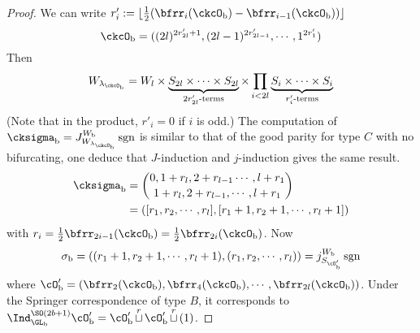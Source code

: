 \documentclass[12pt,a4paper]{amsart}
\newcommand{\sgn}{\operatorname{sgn}}
\numberwithin{equation}{section}
\theoremstyle{remark}
\def\half{{\tfrac{1}{2}}}
\def\floor#1{{\lfloor #1 \rfloor}}
\def\lamckb{\lambda_{\ckcO_{\mathrm b}}}
\def\cuprow{{\stackrel{r}{\sqcup}}}
\def\cuprow{{\,\stackrel{r}{\sqcup}\,}}
\begin{document}
\begin{proof}
{      We can write
      $r'_{i} := \floor{\half(\bfrr_{i}(\ckcO_{\mathrm b})-\bfrr_{i-1}(\ckcO_{\mathrm b}))}$
      \[
        \ckcO_{\mathrm b} %
        = ((2l)^{2r'_{2l}+1}, (2l-1)^{2r'_{2l-1}},\cdots, 1^{2r'_{1}})
      \]
      Then
      \[
        W_{\lamckb} = W_{l} \times \underbrace{S_{2l}\times \cdots \times S_{2l}}_{2r'_{2l}\text{-terms}} \times \prod_{i<2l} \underbrace{S_{i}\times \cdots\times S_{i}}_{r'_{i}\text{-terms}}
      \]
      (Note that in the product, $r'_{i}=0$ if $i$ is odd.) The computation of
      $\cksigma_{\mathrm b} = J_{W_{\lamckb}}^{W_{\mathrm b}} \sgn$ is similar to that of the
      good parity for type $C$ with no bifurcating, one deduce that
      $J$-induction and $j$-induction gives the same result.
      \[
        \begin{split}
          \cksigma_{\mathrm b} &=
          \binom{0, 1+r_{l}, 2+r_{l-1}\cdots, l+r_{1}}{1+r_{l},2+r_{l-1}, \cdots, l+r_{1}}\\
          & = ([r_{1},r_{2},\cdots, r_{l}],[r_{1}+1,r_{2}+1,\cdots,r_{l}+1])\\
        \end{split}
      \]
      with $r_{i} = \half\bfrr_{2i-1}(\ckcO_{\mathrm b}) = \half\bfrr_{2i}(\ckcO_{\mathrm b})$.
      Now
      \[
        \sigma_{\mathrm b} = ((r_{1}+1,r_{2}+1,\cdots,r_{l}+1), (r_{1},r_{2},\cdots, r_{l})) = j_{S_{\cO'_{\mathrm b}}}^{W_{\mathrm b}}\sgn
      \]
      where
      $\cO'_{\mathrm b}=(\bfrr_{2}(\ckcO_{\mathrm b}),\bfrr_{4}(\ckcO_{\mathrm b}),\cdots, \bfrr_{2l}(\ckcO_{\mathrm b}))$.
      Under the Springer correspondence of type $B$, it corresponds to
      $\Ind_{\GL_{\mathrm b}}^{\SO(2b+1)}\cO'_{\mathrm b} = \cO'_{\mathrm b}\cuprow \cO'_{\mathrm b}\cuprow (1)$.



}
\end{proof}
\end{document}
